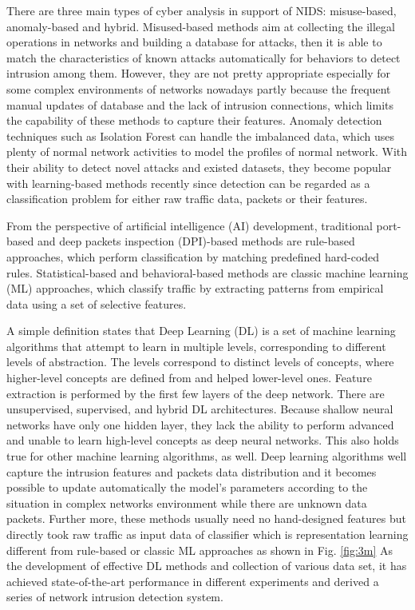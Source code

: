 \documentclass[conference]{IEEEtran}
\begin{document}
There are three main types of cyber analysis in support of NIDS: misuse-based, anomaly-based and hybrid. Misused-based methods aim at collecting the illegal operations in networks and building a database for attacks, then it is able to match the characteristics of known attacks automatically for behaviors to detect intrusion among them. However, they are not pretty appropriate especially for some complex environments of networks nowadays partly because the frequent manual updates of database and the lack of intrusion connections, which limits the capability of these methods to capture their features. Anomaly detection techniques such as Isolation Forest can handle the imbalanced data, which uses plenty of normal network activities to model the profiles of normal network. With their ability to detect novel attacks and existed datasets, they become popular with learning-based methods recently since detection can be regarded as a classification problem for either raw traffic data, packets or their features.

From the perspective of artificial intelligence (AI) development, traditional port-based and deep packets inspection (DPI)-based methods are rule-based approaches, which perform classification by matching predefined hard-coded rules. Statistical-based and behavioral-based methods are classic machine learning (ML) approaches, which classify traffic by extracting patterns from empirical data using a set of selective features. 

A simple definition states that Deep Learning (DL) is a set of machine learning algorithms that attempt to learn in multiple levels, corresponding to different levels of abstraction. The levels correspond to distinct levels of concepts, where higher-level concepts are defined from and helped lower-level ones. Feature extraction is performed by the first few layers of the deep network. There are unsupervised, supervised, and hybrid DL architectures. Because shallow neural networks have only one hidden layer, they lack the ability to perform advanced and unable to learn high-level concepts as deep neural networks. This also holds true for other machine learning algorithms, as well. Deep learning algorithms well capture the intrusion features and packets data distribution and it becomes possible to update automatically the model's parameters according to the situation in complex networks environment while there are unknown data packets. Further more, these methods usually need no hand-designed features but directly took raw traffic as input data of classifier which is representation learning different from rule-based or classic ML approaches as shown in Fig. \ref{fig:3m} As the development of effective DL methods and collection of various data set, it has achieved state-of-the-art performance in different experiments and derived a series of network intrusion detection system.
\end{document}

